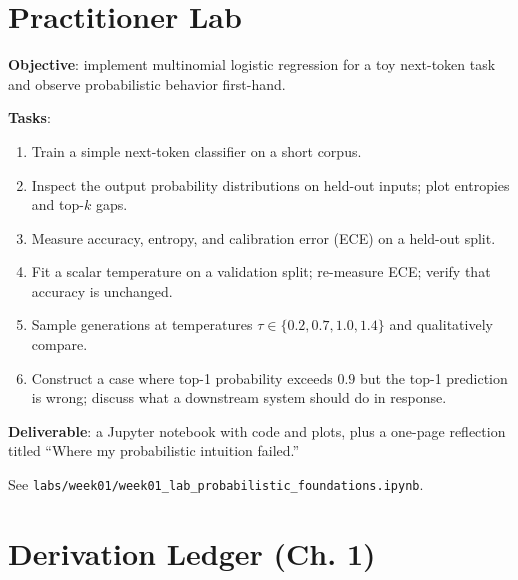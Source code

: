 \section{Practitioner Lab}

\textbf{Objective}: implement multinomial logistic regression for a toy next-token task and observe probabilistic behavior first-hand.

\textbf{Tasks}:
\begin{enumerate}
  \item Train a simple next-token classifier on a short corpus.
  \item Inspect the output probability distributions on held-out inputs; plot entropies and top-$k$ gaps.
  \item Measure accuracy, entropy, and calibration error (ECE) on a held-out split.
  \item Fit a scalar temperature on a validation split; re-measure ECE; verify that accuracy is unchanged.
  \item Sample generations at temperatures $\tau \in \{0.2, 0.7, 1.0, 1.4\}$ and qualitatively compare.
  \item Construct a case where top-1 probability exceeds $0.9$ but the top-1 prediction is wrong; discuss what a downstream system should do in response.
\end{enumerate}

\textbf{Deliverable}: a Jupyter notebook with code and plots, plus a one-page reflection titled ``Where my probabilistic intuition failed.''

See \texttt{labs/week01/week01\_lab\_probabilistic\_foundations.ipynb}.

\section*{Derivation Ledger (Ch. 1)}

